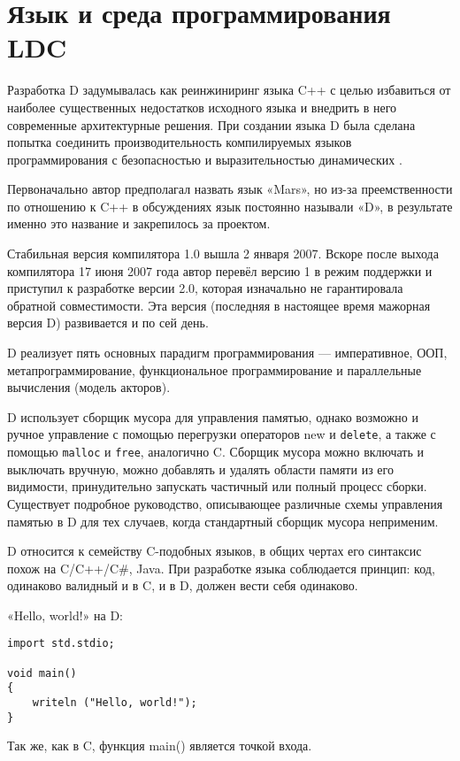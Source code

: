 \documentclass{studrep}
\begin{document}
\chapter{Язык и среда программирования LDC}

Разработка D задумывалась как реинжиниринг языка C++ с целью избавиться от наиболее существенных недостатков исходного языка и внедрить в него современные архитектурные решения. При создании языка D была сделана попытка соединить производительность компилируемых языков программирования с безопасностью и выразительностью динамических \cite{wikipedia}.

Первоначально автор предполагал назвать язык «Mars», но из-за преемственности по отношению к C++ в обсуждениях язык постоянно называли «D», в результате именно это название и закрепилось за проектом.

Стабильная версия компилятора 1.0 вышла 2 января 2007. Вскоре после выхода компилятора 17 июня 2007 года автор перевёл версию 1 в режим поддержки и приступил к разработке версии 2.0, которая изначально не гарантировала обратной совместимости. Эта версия (последняя в настоящее время мажорная версия D) развивается и по сей день.

D реализует пять основных парадигм программирования — императивное, ООП, метапрограммирование, функциональное программирование и параллельные вычисления (модель акторов).

D использует сборщик мусора для управления памятью, однако возможно и ручное управление с помощью перегрузки операторов new и \texttt{delete}, а также с помощью \texttt{malloc} и \texttt{free}, аналогично C. Сборщик мусора можно включать и выключать вручную, можно добавлять и удалять области памяти из его видимости, принудительно запускать частичный или полный процесс сборки. Существует подробное руководство, описывающее различные схемы управления памятью в D для тех случаев, когда стандартный сборщик мусора неприменим.

D относится к семейству C-подобных языков, в общих чертах его синтаксис похож на C/C++/C#, Java. При разработке языка соблюдается принцип: код, одинаково валидный и в C, и в D, должен вести себя одинаково.

«Hello, world!» на D:
\begin{verbatim}
import std.stdio;

void main()
{
    writeln ("Hello, world!");
}
\end{verbatim}
Так же, как в C, функция main() является точкой входа.
\end{document}
